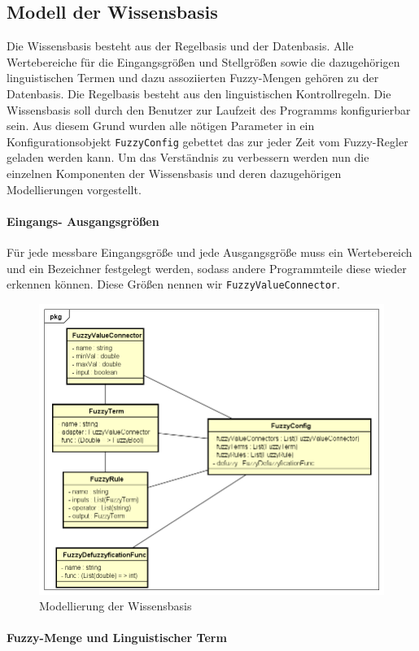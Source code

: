 \documentclass[12pt,a4paper,bibliography=totocnumbered,listof=totocnumbered, abstracton]{scrartcl}
\def\code#1{\texttt{#1}}
\theoremstyle{Umgebung}
\begin{document}
\subsection{Modell der Wissensbasis}

Die Wissensbasis besteht aus der Regelbasis und der Datenbasis. Alle Wertebereiche für die Eingangsgrößen und Stellgrößen sowie die dazugehörigen linguistischen Termen und dazu assoziierten Fuzzy-Mengen gehören zu der Datenbasis. Die Regelbasis besteht aus den linguistischen Kontrollregeln. Die Wissensbasis soll durch den Benutzer zur Laufzeit des Programms konfigurierbar sein. Aus diesem Grund wurden alle nötigen Parameter in ein Konfigurationsobjekt \code{FuzzyConfig} gebettet das zur jeder Zeit vom Fuzzy-Regler geladen werden kann. Um das Verständnis zu verbessern werden nun die einzelnen Komponenten der Wissensbasis und deren dazugehörigen Modellierungen vorgestellt.

\paragraph{Eingangs- Ausgangsgrößen}

Für jede messbare Eingangsgröße und jede Ausgangsgröße muss ein Wertebereich und ein Bezeichner festgelegt werden, sodass andere Programmteile diese wieder erkennen können. Diese Größen nennen wir \code{FuzzyValueConnector}.

\begin{figure}
	\centering
	\includegraphics[width=0.7\linewidth]{img/practical/valueconnector}
	\caption{Modellierung der Wissensbasis}
	\label{fig:valueconnector}
\end{figure}

\paragraph{Fuzzy-Menge und Linguistischer Term}
\end{document}
